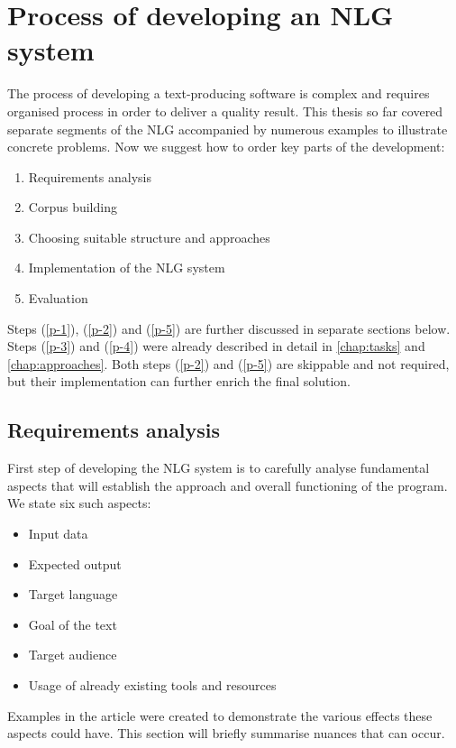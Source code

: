 \chapter{Process of developing an NLG system}\label{chap:process}

The process of developing a text-producing software is complex and requires organised process in order to deliver a quality result. This thesis so far covered separate segments of the NLG accompanied by numerous examples to illustrate concrete problems. Now we suggest how to order key parts of the development:
\begin{enumerate}
	\item Requirements analysis \label{p-1}
	\item Corpus building \label{p-2}
	\item Choosing suitable structure and approaches \label{p-3}
	\item Implementation of the NLG system \label{p-4}
	\item Evaluation \label{p-5}
\end{enumerate}

Steps (\ref{p-1}), (\ref{p-2}) and (\ref{p-5}) are further discussed in separate sections below. Steps (\ref{p-3}) and (\ref{p-4}) were already described in detail in \autoref{chap:tasks} and \autoref{chap:approaches}. Both steps (\ref{p-2}) and (\ref{p-5}) are skippable and not required, but their implementation can further enrich the final solution.

\section{Requirements analysis}

First step of developing the NLG system is to carefully analyse fundamental aspects that will establish the approach and overall functioning of the program. We state six such aspects:
\begin{itemize}
	\item Input data
	\item Expected output
	\item Target language
	\item Goal of the text 
	\item Target audience
	\item Usage of already existing tools and resources 
\end{itemize}

Examples in the article were created to demonstrate the various effects these aspects could have. This section will briefly summarise nuances that can occur. 

